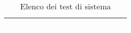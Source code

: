 {
\renewcommand{\arraystretch}{1.5}
\centering
\begin{longtable}{ c | C{3cm} | C{11cm} }
\caption{Elenco dei test di sistema}\\
\textcolor{white}{\textbf{Codice}} & \textcolor{white}{\textbf{Titolo}} & \textcolor{white}{\textbf{Descrizione}} \\
\hline
\endhead
    
    
    
\end{longtable}
}
